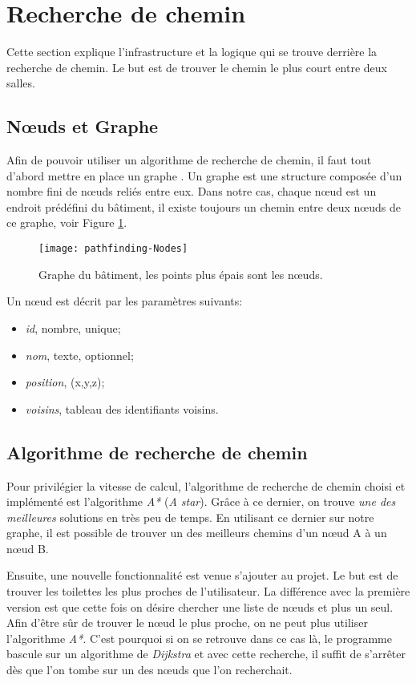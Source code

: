 \section{Recherche de chemin}
Cette section explique l'infrastructure et la logique qui se trouve derrière la recherche de chemin. Le but est de trouver le chemin le plus court entre deux salles.

\subsection{Nœuds et Graphe}
Afin de pouvoir utiliser un algorithme de recherche de chemin, il faut tout d'abord mettre en place un graphe \cite{wiki-graph}. Un graphe est une structure composée d'un nombre fini de nœuds reliés entre eux. Dans notre cas, chaque nœud est un endroit prédéfini du bâtiment, il existe toujours un chemin entre deux nœuds de ce graphe, voir Figure \ref{fig:pathfinding-nodes}.

\begin{figure}
	\centering
	\texttt{[image: pathfinding-Nodes]}
	\caption{Graphe du bâtiment, les points plus épais sont les nœuds.}
	\label{fig:pathfinding-nodes}
\end{figure}

Un nœud est décrit par les paramètres suivants:
\begin{itemize}[noitemsep]
	\item \emph{id}, nombre, unique;
	\item \emph{nom}, texte, optionnel;
	\item \emph{position}, (x,y,z);
	\item \emph{voisins}, tableau des identifiants voisins.
\end{itemize}

\subsection{Algorithme de recherche de chemin}
Pour privilégier la vitesse de calcul, l'algorithme de recherche de chemin choisi et implémenté est l'algorithme \emph{A*} \cite{wiki-astar} (\textit{A star}). Grâce à ce dernier, on trouve \textit{une des meilleures} solutions en très peu de temps. En utilisant ce dernier sur notre graphe, il est possible de trouver un des meilleurs chemins d'un nœud A à un nœud B.

Ensuite, une nouvelle fonctionnalité est venue s'ajouter au projet. Le but est de trouver les toilettes les plus proches de l'utilisateur. La différence avec la première version est que cette fois on désire chercher une liste de nœuds et plus un seul. Afin d'être sûr de trouver le nœud le plus proche, on ne peut plus utiliser l'algorithme \textit{A*}. C'est pourquoi si on se retrouve dans ce cas là, le programme bascule sur un algorithme de \emph{Dijkstra} \cite{wiki-dijkstra} et avec cette recherche, il suffit de s'arrêter dès que l'on tombe sur un des nœuds que l'on recherchait.